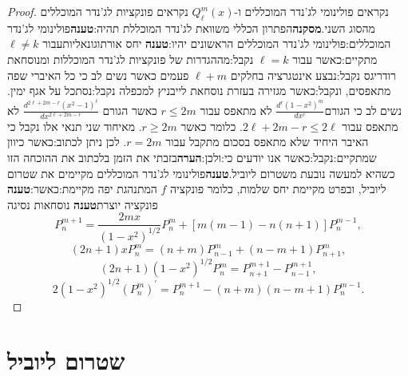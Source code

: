 \documentclass{tstextbook}
\begin{document}
\begin{proof}
נקראים פולינומי לג'נדר המוכללים ו-\(Q^{m}_{\ell}(x)\) נקראים פונקציות לג'נדר המוכללים מהסוג השני.\textbf{מסקנה}הפתרון הכללי משוואת לג'נדר המוכללת תהיה:\textbf{טענה}פולינומי לג'נדר המוכללים:פולינומי לג'נדר המוכללים הראשונים יהיו:\textbf{טענה} יחס אורתוגונאליותעבור \(\ell \neq k\) מתקיים:כאשר עבור \(\ell=k\) נקבל:מההגדרות של פונקציות לג'נדר המוכללות ומנוסחאת רודריגס נקבל:נבצע אינטגרציה בחלקים \(\ell+m\) פעמים כאשר נשים לב כי כל האיברי שפה מתאפסים, ונקבל:כאשר מגזירה בעזרת נוסחאת לייבניץ למכפלה נקבל:נסתכל על אגף ימין. נשים לב כי הגורם\(\frac{d^{r}(1-x^{2})^{m}}{d x^{r}}\) לא מתאפס עבור \(r\leq 2m\) כאשר הגורם \(\frac{d^{2\ell+2m-r}(x^{2}-1)^{\ell}}{d x^{2\ell+2m-r}}\) לא מתאפס עבור \(2\ell+2m-r\leq 2\ell\). כלומר כאשר \(r\geq 2m\). מאיחוד שני תנאי אלו נקבל כי האיבר היחיד שלא מתאפס בסכום מתקבל עבור \(r=2m\). לכן ניתן לכתוב:כאשר כיוון שמתקיים:נקבל:כאשר אנו יודעים כי:ולכן:\textbf{הערה}בזבתי את הזמן בלכתוב את ההוכחה הזו כשהיא למעשה נובעת משטרום ליוביל.\textbf{טענה}פולינומי לג'נדר המוכללים מקיימים את שטרום ליוביל, ובפרט מקיימת יחס שלמות, כלומר פונקציה \(f\) המתנהגת יפה מקיימת:כאשר:\textbf{טענה} פונקציה יוצרת\textbf{טענה} נוסחאות נסיגה
$$P_{n}^{m+1}=\frac{2m x}{(1-x^{2})^{1/2}}P_{n}^{m}+[m(m-1)-n(n+1)]P_{n}^{m-1},$$$$(2n+1)xP_{n}^{m}=(n+m)P_{n-1}^{m}+(n-m+1)P_{n+1}^{m},$$$$(2n+1)(1-x^{2})^{1/2}P_{n}^{m}=P_{n+1}^{m+1}-P_{n-1}^{m+1},$$$$2(1-x^{2})^{1/2}(P_{n}^{m})^{\prime}=P_{n}^{m+1}-(n+m)(n-m+1)P_{n}^{m-1}.$$

\end{proof}
\section{שטרום ליוביל}
\end{document}
